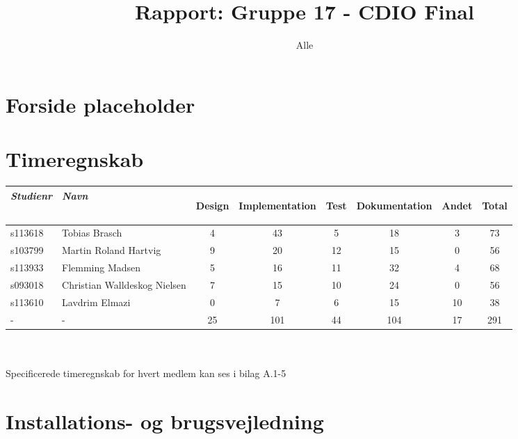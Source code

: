 \documentclass[a4paper]{article}
\title{Rapport: Gruppe 17 - CDIO Final}
\author{
  Alle
}
\begin{document}
\section*{Forside placeholder} %

\clearpage

\section*{Timeregnskab} %

\begin{tabular}{l l | c c c c c | c}

  \emph{Studienr} & \emph{Navn}
  & \begin{sideways}Design\end{sideways} 
  & \begin{sideways}Implementation\end{sideways} 
  & \begin{sideways}Test\end{sideways} 
  & \begin{sideways}Dokumentation\end{sideways} 
  & \begin{sideways}Andet\end{sideways} 
  & \begin{sideways}Total\end{sideways} \\
  \hline
  s113618 & Tobias Brasch                & 4 & 43 & 5  & 18 & 3 & 73 \\
  s103799 & Martin Roland Hartvig        & 9 & 20 & 12 & 15 & 0 & 56 \\
  s113933 & Flemming Madsen              & 5 & 16 & 11 & 32 & 4 & 68 \\
  s093018 & Christian Walldeskog Nielsen & 7 & 15 & 10 & 24 & 0 & 56 \\
  s113610 & Lavdrim Elmazi               & 0 & 7  & 6  & 15 & 10 & 38 \\
  \hline
  -       & -                            & 25 & 101 & 44 & 104 & 17 & 291
\end{tabular}
\\ \\Specificerede timeregnskab for hvert medlem kan ses i bilag A.1-5

\clearpage

\section*{Installations- og brugsvejledning} %
\end{document}
